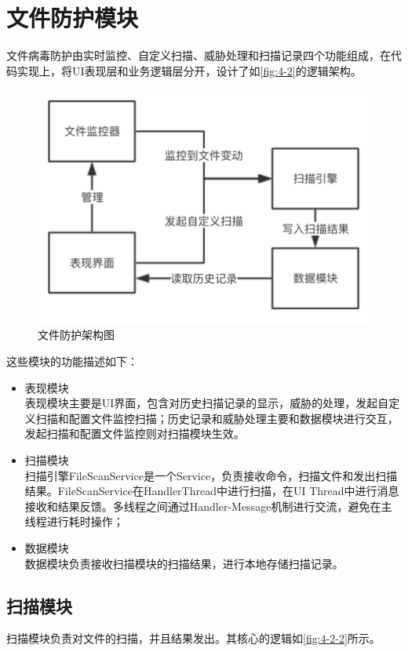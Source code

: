 \documentclass[format=final, language=chinese, degree=fyp]{hustthesis}
\begin{document}
	
\section{文件防护模块}

文件病毒防护由实时监控、自定义扫描、威胁处理和扫描记录四个功能组成，在代码实现上，将UI表现层和业务逻辑层分开，设计了如\autoref{fig:4-2}的逻辑架构。


\begin{figure}[!h]
	\centering
	\includegraphics[width=.6\textwidth]{function_2_ori.png}
	\caption{文件防护架构图}\label{fig:4-2}
\end{figure}

这些模块的功能描述如下：

\begin{itemize}
    \item 表现模块\\ 表现模块主要是UI界面，包含对历史扫描记录的显示，威胁的处理，发起自定义扫描和配置文件监控扫描；历史记录和威胁处理主要和数据模块进行交互，发起扫描和配置文件监控则对扫描模块生效。
    \item 扫描模块\\ 扫描引擎FileScanService是一个Service，负责接收命令，扫描文件和发出扫描结果。FileScanService在HandlerThread中进行扫描，在UI Thread中进行消息接收和结果反馈。多线程之间通过Handler-Message机制进行交流，避免在主线程进行耗时操作； 
    \item 数据模块\\ 数据模块负责接收扫描模块的扫描结果，进行本地存储扫描记录。
\end{itemize}

\subsection{扫描模块}

扫描模块负责对文件的扫描，并且结果发出。其核心的逻辑如\autoref{fig:4-2-2}所示。
\end{document}
